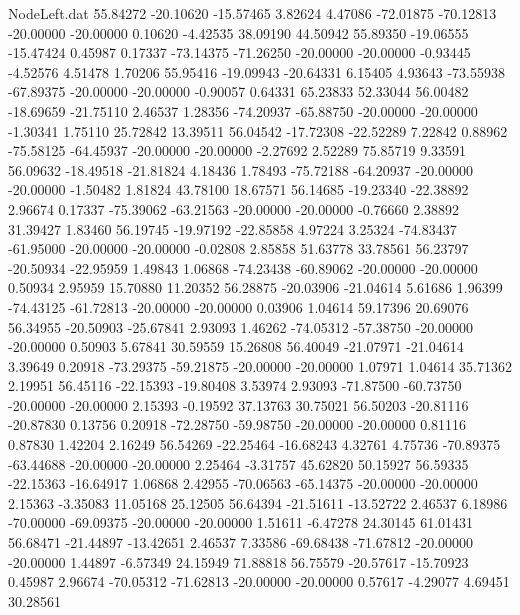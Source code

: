 \begin{filecontents}{NodeLeft.dat}
  55.84272  -20.10620  -15.57465     3.82624    4.47086  -72.01875  -70.12813  -20.00000  -20.00000    0.10620   -4.42535   38.09190   44.50942
  55.89350  -19.06555  -15.47424     0.45987    0.17337  -73.14375  -71.26250  -20.00000  -20.00000   -0.93445   -4.52576    4.51478    1.70206
  55.95416  -19.09943  -20.64331     6.15405    4.93643  -73.55938  -67.89375  -20.00000  -20.00000   -0.90057    0.64331   65.23833   52.33044
  56.00482  -18.69659  -21.75110     2.46537    1.28356  -74.20937  -65.88750  -20.00000  -20.00000   -1.30341    1.75110   25.72842   13.39511
  56.04542  -17.72308  -22.52289     7.22842    0.88962  -75.58125  -64.45937  -20.00000  -20.00000   -2.27692    2.52289   75.85719    9.33591
  56.09632  -18.49518  -21.81824     4.18436    1.78493  -75.72188  -64.20937  -20.00000  -20.00000   -1.50482    1.81824   43.78100   18.67571
  56.14685  -19.23340  -22.38892     2.96674    0.17337  -75.39062  -63.21563  -20.00000  -20.00000   -0.76660    2.38892   31.39427    1.83460
  56.19745  -19.97192  -22.85858     4.97224    3.25324  -74.83437  -61.95000  -20.00000  -20.00000   -0.02808    2.85858   51.63778   33.78561
  56.23797  -20.50934  -22.95959     1.49843    1.06868  -74.23438  -60.89062  -20.00000  -20.00000    0.50934    2.95959   15.70880   11.20352
  56.28875  -20.03906  -21.04614     5.61686    1.96399  -74.43125  -61.72813  -20.00000  -20.00000    0.03906    1.04614   59.17396   20.69076
  56.34955  -20.50903  -25.67841     2.93093    1.46262  -74.05312  -57.38750  -20.00000  -20.00000    0.50903    5.67841   30.59559   15.26808
  56.40049  -21.07971  -21.04614     3.39649    0.20918  -73.29375  -59.21875  -20.00000  -20.00000    1.07971    1.04614   35.71362    2.19951
  56.45116  -22.15393  -19.80408     3.53974    2.93093  -71.87500  -60.73750  -20.00000  -20.00000    2.15393   -0.19592   37.13763   30.75021
  56.50203  -20.81116  -20.87830     0.13756    0.20918  -72.28750  -59.98750  -20.00000  -20.00000    0.81116    0.87830    1.42204    2.16249
  56.54269  -22.25464  -16.68243     4.32761    4.75736  -70.89375  -63.44688  -20.00000  -20.00000    2.25464   -3.31757   45.62820   50.15927
  56.59335  -22.15363  -16.64917     1.06868    2.42955  -70.06563  -65.14375  -20.00000  -20.00000    2.15363   -3.35083   11.05168   25.12505
  56.64394  -21.51611  -13.52722     2.46537    6.18986  -70.00000  -69.09375  -20.00000  -20.00000    1.51611   -6.47278   24.30145   61.01431
  56.68471  -21.44897  -13.42651     2.46537    7.33586  -69.68438  -71.67812  -20.00000  -20.00000    1.44897   -6.57349   24.15949   71.88818
  56.75579  -20.57617  -15.70923     0.45987    2.96674  -70.05312  -71.62813  -20.00000  -20.00000    0.57617   -4.29077    4.69451   30.28561

\end{filecontents}
